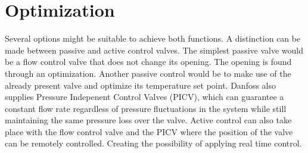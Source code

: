\chapter{Optimization}\label{chap::optimization}

Several options might be suitable to achieve both functions. A distinction can be made between passive and active control valves. The simplest passive valve would be a flow control valve that does not change its opening. The opening is found through an optimization. Another passive control would be to make use of the already present valve and optimize its temperature set point. Danfoss also supplies Pressure Indepenent Control Valves (PICV), which can guarantee a constant flow rate regardless of pressure fluctuations in the system while still maintaining the same pressure loss over the valve. Active control can also take place with the flow control valve and the PICV where the position of the valve can be remotely controlled. Creating the possibility of applying real time control.  